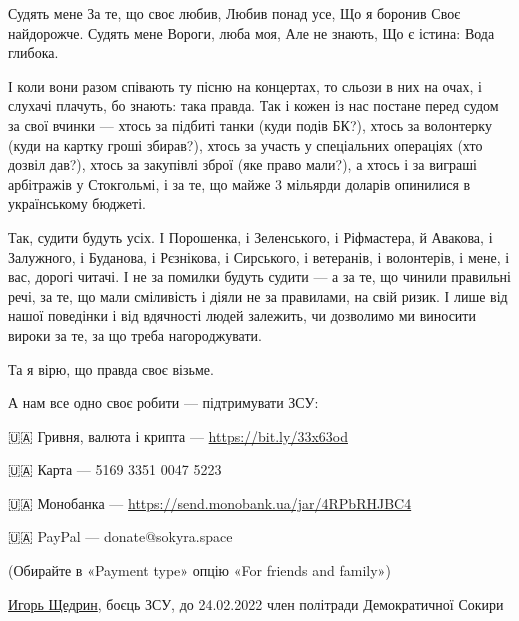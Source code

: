 \obeycr
Судять мене
За те, що своє любив,
Любив понад усе,
Що я боронив
Своє найдорожче.
Судять мене
Вороги, люба моя,
Але не знають,
Що є істина:
Вода глибока.
\restorecr

І коли вони разом співають ту пісню на концертах, то сльози в них на очах, і
слухачі плачуть, бо знають: така правда. Так і кожен із нас постане перед судом
за свої вчинки — хтось за підбиті танки (куди подів БК?), хтось за волонтерку
(куди на картку гроші збирав?), хтось за участь у спеціальних операціях (хто
дозвіл дав?), хтось за закупівлі зброї (яке право мали?), а хтось і за виграші
арбітражів у Стокгольмі, і за те, що майже 3 мільярди доларів опинилися в
українському бюджеті.

Так, судити будуть усіх. І Порошенка, і Зеленського, і Ріфмастера, й Авакова, і
Залужного, і Буданова, і Рєзнікова, і Сирського, і ветеранів, і волонтерів, і
мене, і вас, дорогі читачі. І не за помилки будуть судити — а за те, що чинили
правильні речі, за те, що мали сміливість і діяли не за правилами, на свій
ризик. І лише від нашої поведінки і від вдячності людей залежить, чи дозволимо
ми виносити вироки за те, за що треба нагороджувати.

Та я вірю, що правда своє візьме.

А нам все одно своє робити — підтримувати ЗСУ:

🇺🇦 Гривня, валюта і крипта — \url{https://bit.ly/33x63od}

🇺🇦 Карта — 5169 3351 0047 5223 

🇺🇦 Монобанка — \url{https://send.monobank.ua/jar/4RPbRHJBC4}

🇺🇦 PayPal — donate@sokyra.space 

(Обирайте в «Payment type» опцію «For friends and family»)

\href{https://www.facebook.com/profile.php?id=100013467931016}{Игорь Щедрин}, боєць ЗСУ, до 24.02.2022 член політради Демократичної Сокири
